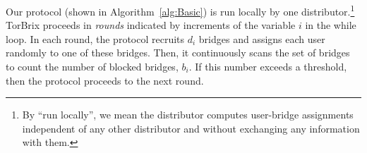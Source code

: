 \documentclass[letterpaper,twocolumn,10pt]{article}
\newcommand{\sfsize}{\fontsize{0.73\baselineskip}{0.73\baselineskip}\selectfont}
\newcommand{\sans}[1]{\textsf{\sfsize \mbox{#1}}}
\newcommand{\brix}{\sans{TorBrix}\xspace}
\begin{document}


Our protocol (shown in Algorithm~\ref{alg:Basic}) is run locally by one distributor.\footnote{By ``run locally'', we mean the distributor computes user-bridge assignments independent of any other distributor and without exchanging any information with them.} 
\brix proceeds in \emph{rounds} indicated by increments of the variable $i$ in the while loop.
In each round, the protocol recruits $d_i$ bridges and assigns each user randomly to one of these bridges. Then, it continuously scans the set of bridges to count the number of blocked bridges, $b_i$. If this number exceeds a threshold, then the protocol proceeds to the next round. %
\end{document}
